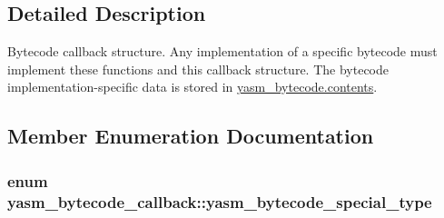 \subsection{Detailed Description}
Bytecode callback structure. Any implementation of a specific bytecode must implement these functions and this callback structure. The bytecode implementation-\/specific data is stored in \hyperlink{structyasm__bytecode_a00b5eeb6ac2908972964ec3daef631c1}{yasm\-\_\-bytecode.\-contents}. 

\subsection{Member Enumeration Documentation}
\hypertarget{structyasm__bytecode__callback_a872481e79c8510c5b8559f74599b4e20}{
\subsubsection[{yasm\-\_\-bytecode\-\_\-special\-\_\-type}]{\setlength{\rightskip}{0pt plus 5cm}enum {\bf yasm\-\_\-bytecode\-\_\-callback\-::yasm\-\_\-bytecode\-\_\-special\-\_\-type}}}\label{structyasm__bytecode__callback_a872481e79c8510c5b8559f74599b4e20}

